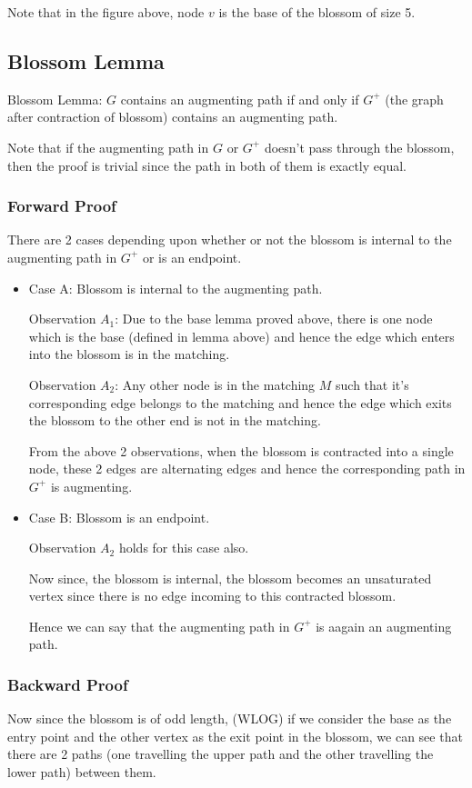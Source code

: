 \documentclass{article}
\begin{document}
Note that in the figure above, node $v$ is the base of the blossom of size 5.

\subsection{Blossom Lemma}
Blossom Lemma: $G$ contains an augmenting path if and only if $G^+$ (the graph after contraction of blossom) contains an augmenting path.

Note that if the augmenting path in $G$ or $G^+$ doesn't pass through the blossom, then the proof is trivial since the path in both of them is exactly equal.

\subsubsection{Forward Proof}
There are 2 cases depending upon whether or not the blossom is internal to the augmenting path in $G^+$ or is an endpoint.
\begin{itemize}
    \item Case A: Blossom is internal to the augmenting path. 
        
        Observation $A_1$: Due to the base lemma proved above, there is one node which is the base (defined in lemma above) and hence the edge which enters into the blossom is in the matching.
        
        Observation $A_2$: Any other node is in the matching $M$ such that it's corresponding edge belongs to the matching and hence the edge which exits the blossom to the other end is not in the matching.
        
        From the above 2 observations, when the blossom is contracted into a single node, these 2 edges are alternating edges and hence the corresponding path in $G^+$ is augmenting.
    \item Case B: Blossom is an endpoint.
        
        Observation $A_2$ holds for this case also.
        
        Now since, the blossom is internal, the blossom becomes an unsaturated vertex since there is no edge incoming to this contracted blossom. 
        
        Hence we can say that the augmenting path in $G^+$ is aagain an augmenting path.
        
\end{itemize}


\subsubsection{Backward Proof}
Now since the blossom is of odd length, (WLOG) if we consider the base as the entry point and the other vertex as the exit point in the blossom, we can see that there are 2 paths (one travelling the upper path and the other travelling the lower path) between them. 
\end{document}
